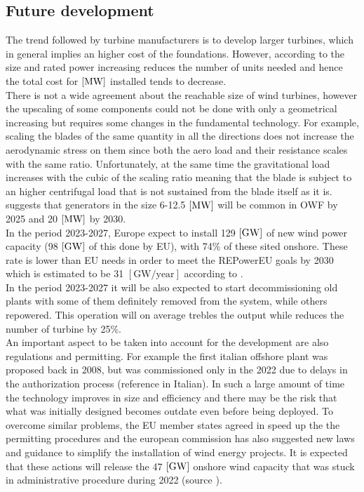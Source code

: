 \subsection{Future development}
The trend followed by turbine manufacturers is to develop larger turbines, which in general implies an higher cost of the foundations. However, according to \cite{current_staus_and_future_trends_of_offshore_wind_power_in_europe} the size and rated power increasing reduces the number of units needed and hence the total cost for $\left[\si{\mega\watt}\right]$ installed tends to decrease.\\
There is not a wide agreement about the reachable size of wind turbines, however the upscaling of some components could not be done with only a geometrical increasing but requires some changes in the fundamental technology. For example, scaling the blades of the same quantity in all the directions does not increase the aerodynamic stress on them since both the aero load and their resistance scales with the same ratio. Unfortunately, at the same time the gravitational load increases with the cubic of the scaling ratio meaning that the blade is subject to an higher centrifugal load that is not sustained from the blade itself as it is. \\
\cite{current_staus_and_future_trends_of_offshore_wind_power_in_europe} suggests that generators in the size 6-12.5 $\left[\si{\mega\watt}\right]$ will be common in OWF by 2025 and 20 $\left[\si{\mega\watt}\right]$ by 2030.\\
In the period 2023-2027, Europe expect to install 129 $\left[\si{\giga\watt}\right]$ of new wind power capacity (98 $\left[\si{\giga\watt}\right]$ of this done by EU), with 74\% of these sited onshore. These rate is lower than EU needs in order to meet the REPowerEU goals by 2030 which is estimated to be 31 $\left[\text{GW/year}\right]$ according to \cite{wind_europe_data_2022}. \\
In the period 2023-2027 it will be also expected to start decommissioning old plants with some of them definitely removed from the system, while others repowered. This operation will on average trebles the output while reduces the number of turbine by 25\%. \\
An important aspect to be taken into account for the development are also regulations and permitting. For example the first italian offshore plant was proposed back in 2008, but was commissioned only in the 2022 due to delays in the authorization process \cite{il_post} (reference in Italian). In such a large amount of time the technology improves in size and efficiency and there may be the risk that what was initially designed becomes outdate even before being deployed. To overcome similar problems, the EU member states agreed in speed up the the permitting procedures and the european commission has also suggested new laws and guidance to simplify the installation of wind energy projects. It is expected that these actions will release the 47 $\left[\si{\giga\watt}\right]$ onshore wind capacity that was stuck in administrative procedure during 2022 (source \cite{wind_europe_data_2022}).  